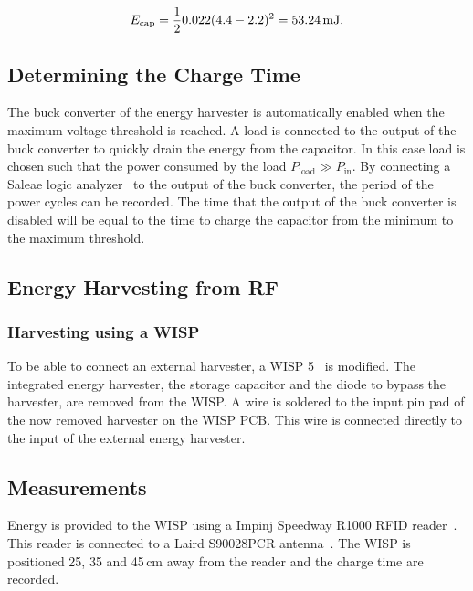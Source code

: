 \begin{equation}
\label{eq:cap2}
E_{\text{cap}} = \frac{1}{2} 0.022 (4.4 - 2.2)^2 = 53.24 \text{\,mJ}.
\end{equation}


\subsection{Determining the Charge Time}

The buck converter of the energy harvester is automatically enabled when the maximum voltage threshold is reached.
A load is connected to the output of the buck converter to quickly drain the energy from the capacitor.
In this case load is chosen such that the power consumed by the load $P_{\text{load}} \gg P_{\text{in}}$.
By connecting a Saleae logic analyzer~\cite{saleae_2017} to the output of the buck converter, the period of the power cycles can be recorded.
The time that the output of the buck converter is disabled will be equal to the time to charge the capacitor from the minimum to the maximum threshold.

\subsection{Energy Harvesting from RF}

\subsubsection{Harvesting using a WISP}
To be able to connect an external harvester, a WISP 5~\cite{sample_transim_2008} is modified.
The integrated energy harvester, the storage capacitor and the diode to bypass the harvester, are removed from the WISP.
A wire is soldered to the input pin pad of the now removed harvester on the WISP PCB.
This wire is connected directly to the input of the external energy harvester.

\subsection{Measurements}
Energy is provided to the WISP using a Impinj Speedway R1000 RFID reader~\cite{impinj_eol_2017, indy_r1000_2017}.
This reader is connected to a Laird S90028PCR antenna~\cite{laird_s9028pcr_2017}.
The WISP is positioned 25, 35 and 45\,cm away from the reader and the charge time are recorded.

